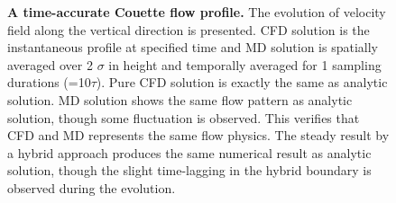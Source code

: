 \documentclass[preprint,12pt]{elsarticle}
\begin{document}
\begin{figure}
\centering
{}
\hskip 1cm
\vskip-0.2cm
\caption[]{\small {\bf A time-accurate Couette flow profile.} The evolution of velocity field along the vertical direction is presented. CFD solution is the instantaneous profile at specified time and MD solution is spatially averaged over 2 $\sigma$ in height and temporally averaged for 1 sampling durations (=10$\tau$).
 Pure CFD solution is exactly the same as analytic solution. MD solution shows the same flow pattern as analytic solution, though some fluctuation is observed. This verifies that CFD and MD represents the same flow physics.
 The steady result by a hybrid approach produces the same numerical result as analytic solution, though the slight time-lagging in the hybrid boundary is observed during the evolution.}
\label{Flat_Plate_Sol}
\end{figure}
\end{document}
